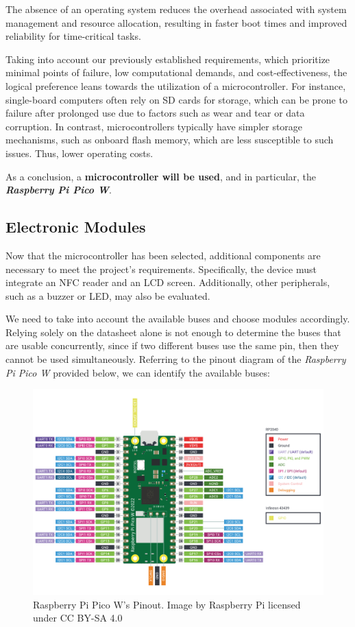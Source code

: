 The absence of an operating system reduces the overhead associated with system management and resource allocation, resulting 
in faster boot times and improved reliability for time-critical tasks.

Taking into account our previously established requirements, which prioritize minimal points of failure, low computational 
demands, and cost-effectiveness, the logical preference leans towards the utilization of a microcontroller. For instance, 
single-board computers often rely on SD cards for storage, which can be prone to failure after prolonged use due to factors 
such as wear and tear or data corruption. In contrast, microcontrollers typically have simpler storage mechanisms, such as 
onboard flash memory, which are less susceptible to such issues. Thus, lower operating costs.

As a conclusion, a \textbf{microcontroller will be used}, and in particular, the \textit{\textbf{Raspberry Pi Pico W}}.

%
%
\subsection{Electronic Modules}

Now that the microcontroller has been selected, additional components are necessary to meet the project's requirements. 
Specifically, the device must integrate an NFC reader and an LCD screen. Additionally, other peripherals, such as a buzzer 
or LED, may also be evaluated.

We need to take into account the available buses and choose modules accordingly. Relying solely on the datasheet alone is 
not enough to determine the buses that are usable concurrently, since if two different buses use the same pin, then they 
cannot be used simultaneously. Referring to the pinout diagram of the \textit{Raspberry Pi Pico W} provided below, we can 
identify the available buses:

\begin{figure}[h]
	\centering
	\includegraphics[width = 1\textwidth]{Imagenes/Vectorial/picow-pinout.pdf}
	\caption{Raspberry Pi Pico W's Pinout. Image by Raspberry Pi licensed under CC BY-SA 4.0}
	\label{fig:piPicoPinout}
\end{figure}

